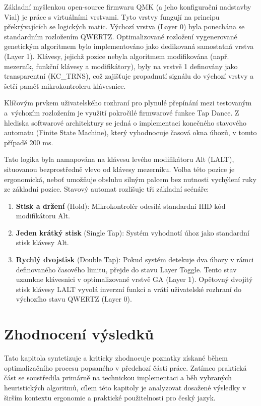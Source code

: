 \documentclass[a4paper, twoside, 12pt, czech]{article}
\begin{document}
Základní myšlenkou open-source firmwaru QMK (a jeho konfigurační nadstavby Vial) 
je práce s virtuálními vrstvami. Tyto vrstvy fungují na principu překrývajících 
se logických matic. Výchozí vrstva (Layer 0) byla ponechána se standardním 
rozložením QWERTZ. Optimalizované rozložení vygenerované genetickým algoritmem 
bylo implementováno jako dedikovaná samostatná vrstva (Layer 1). Klávesy, jejichž 
pozice nebyla algoritmem modifikována (např. mezerník, funkční klávesy a modifikátory), 
byly na vrstvě 1 definovány jako transparentní (KC\_TRNS), což zajišťuje propadnutí 
signálu do výchozí vrstvy a šetří paměť mikrokontroleru klávesnice.

Klíčovým prvkem uživatelského rozhraní pro plynulé přepínání mezi testovaným 
a~výchozím rozložením je využití pokročilé firmwarové funkce Tap Dance. Z hlediska 
softwarové architektury se jedná o implementaci konečného stavového automatu 
(Finite State Machine), který vyhodnocuje časová okna úhozů, v tomto případě 200 ms.

Tato logika byla namapována na klávesu levého modifikátoru Alt (LALT), situovanou 
bezprostředně vlevo od klávesy mezerníku. Volba této pozice je ergonomická, neboť 
umožňuje obsluhu silným palcem bez nutnosti vychýlení ruky ze základní pozice. 
Stavový automat rozlišuje tři základní scénáře:
\begin{enumerate}
    \item \textbf{Stisk a držení} (Hold): Mikrokontrolér odesílá standardní HID kód modifikátoru Alt.
    \item \textbf{Jeden krátký stisk} (Single Tap): Systém vyhodnotí úhoz jako standardní stisk klávesy Alt.
    \item \textbf{Rychlý dvojstisk} (Double Tap): Pokud systém detekuje dva úhozy v rámci 
    definovaného časového limitu, přejde do stavu Layer Toggle. Tento stav uzamkne 
    klávesnici v optimalizované vrstvě GA (Layer 1). Opětovný dvojitý stisk klávesy 
    LALT vyvolá inverzní funkci a vrátí uživatelské rozhraní do výchozího stavu 
    QWERTZ (Layer 0).
\end{enumerate}

\clearpage

\section{Zhodnocení výsledků}
Tato kapitola syntetizuje a kriticky zhodnocuje poznatky získané během 
optimalizačního procesu popsaného v předchozí části práce. Zatímco praktická 
část se soustředila primárně na technickou implementaci a běh vybraných 
heuristických algoritmů, cílem této kapitoly je analyzovat dosažené výsledky 
v širším kontextu ergonomie a praktické použitelnosti pro český jazyk.
\end{document}
